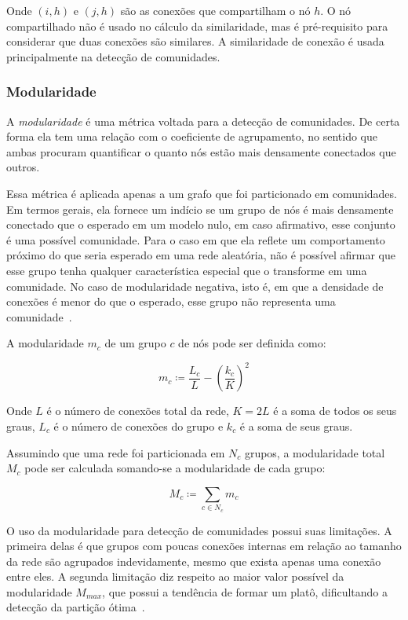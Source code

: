 \documentclass[12pt,a4paper]{article}
\theoremstyle{hypo}
\newcommand{\defn}{\coloneqq} %
\begin{document}
Onde $(i,h)$ e $(j,h)$ são as conexões que compartilham o nó $h$. O nó compartilhado não é usado no cálculo da similaridade, mas é pré-requisito para considerar que duas conexões são similares. A similaridade de conexão é usada principalmente na detecção de comunidades.

\subsubsection{Modularidade} \label{sec:modularidade}

A \textit{modularidade} é uma métrica voltada para a detecção de comunidades. De certa forma ela tem uma relação com o coeficiente de agrupamento, no sentido que ambas procuram quantificar o quanto nós estão mais densamente conectados que outros.

Essa métrica é aplicada apenas a um grafo que foi particionado em comunidades. Em termos gerais, ela fornece um indício se um grupo de nós é mais densamente conectado que o esperado em um modelo nulo, em caso afirmativo, esse conjunto é uma possível comunidade. Para o caso em que ela reflete um comportamento próximo do que seria esperado em uma rede aleatória, não é possível afirmar que esse grupo tenha qualquer característica especial que o transforme em uma comunidade. No caso de modularidade negativa, isto é, em que a densidade de conexões é menor do que o esperado, esse grupo não representa uma comunidade~\cite{Barabasi2016-rn}.

A modularidade $m_c$ de um grupo $c$ de nós pode ser definida como:

\begin{equation} \label{eq:modularidade-local}
m_c \defn \frac{L_c}{L} - \left( \frac{k_c}{K} \right)^2
\end{equation}

Onde $L$ é o número de conexões total da rede, $K = 2L$ é a soma de todos os seus graus, $L_c$ é o número de conexões do grupo e $k_c$ é a soma de seus graus.

Assumindo que uma rede foi particionada em $N_c$ grupos, a modularidade total $M_c$ pode ser calculada somando-se a modularidade de cada grupo:

\begin{equation} \label{eq:modularidade-global}
M_c \defn \sum_{c \in N_c} m_c
\end{equation}

O uso da modularidade para detecção de comunidades possui suas limitações. A primeira delas é que grupos com poucas conexões internas em relação ao tamanho da rede são agrupados indevidamente, mesmo que exista apenas uma conexão entre eles. A segunda limitação diz respeito ao maior valor possível da modularidade $M_\textit{max}$, que possui a tendência de formar um platô, dificultando a detecção da partição ótima~\cite{Barabasi2016-rn}.
\end{document}
